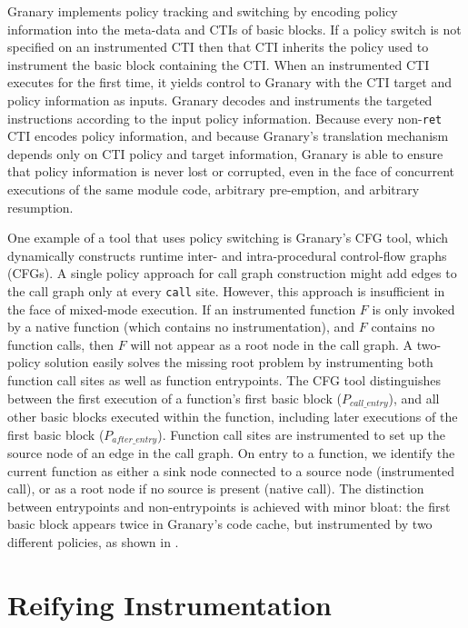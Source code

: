 \documentclass[preprint]{sigplanconf}
\begin{document}
Granary implements policy tracking and switching by encoding policy information into the meta-data and CTIs of basic blocks. If a policy switch is not specified on an instrumented CTI then that CTI inherits the policy used to instrument the basic block containing the CTI. When an instrumented CTI executes for the first time, it yields control to Granary with the CTI target and policy information as inputs. Granary decodes and instruments the targeted instructions according to the input policy information. Because every non-\texttt{ret} CTI encodes policy information, and because Granary's translation mechanism depends only on CTI policy and target information, Granary is able to ensure that policy information is never lost or corrupted, even in the face of concurrent executions of the same module code, arbitrary pre-emption, and arbitrary resumption.

One example of a tool that uses policy switching is Granary's CFG tool, which dynamically constructs runtime inter- and intra-procedural control-flow graphs (CFGs). A single policy approach for call graph construction might add edges to the call graph only at every \texttt{call} site. However, this approach is insufficient in the face of mixed-mode execution. If an instrumented function $F$ is only invoked by a native function (which contains no instrumentation), and $F$ contains no function calls, then $F$ will not appear as a root node in the call graph. A two-policy solution easily solves the missing root problem by instrumenting both function call sites as well as function entrypoints. The CFG tool distinguishes between the first execution of a function's first basic block ($P_{\mathit{call\_entry}}$), and all other basic blocks executed within the function, including later executions of the first basic block ($P_{\mathit{after\_entry}}$). Function call sites are instrumented to set up the source node of an edge in the call graph. On entry to a function, we identify the current function as either a sink node connected to a source node (instrumented call), or as a root node if no source is present (native call). The distinction between entrypoints and non-entrypoints is achieved with minor bloat: the first basic block appears twice in Granary's code cache, but instrumented by two different policies, as shown in .




\section{Reifying Instrumentation}\label{sec:reify}
\end{document}
